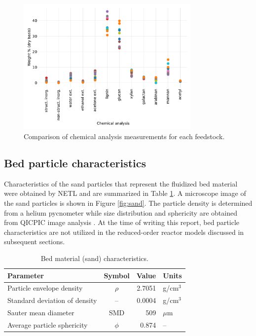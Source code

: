 \begin{figure}[H]
    \centering
    \includegraphics[width=0.8\textwidth]{figures/chem-analysis.pdf}
    \caption{Comparison of chemical analysis measurements for each feedstock.}
    \label{fig:chem-analysis}
\end{figure}

\subsection{Bed particle characteristics}

Characteristics of the sand particles that represent the fluidized bed material were obtained by NETL and are summarized in Table \ref{tab:sand}. A microscope image of the sand particles is shown in Figure \ref{fig:sand}. The particle density is determined from a helium pycnometer while size distribution and sphericity are obtained from QICPIC image analysis \cite{Netl-2021}. At the time of writing this report, bed particle characteristics are not utilized in the reduced-order reactor models discussed in subsequent sections.

\begin{table}[H]
    \caption{Bed material (sand) characteristics.}
    \label{tab:sand}
    \centering
    \begin{tabular}{lcrl}
        \toprule
        Parameter & Symbol & Value & Units \\
        \midrule
        Particle envelope density     & $\rho$ & 2.7051 & g/cm$^3$ \\
        Standard deviation of density & --     & 0.0004 & g/cm$^3$ \\
        Sauter mean diameter          & SMD    & 509    & $\mu$m \\
        Average particle sphericity   & $\phi$ & 0.874  & -- \\
        \bottomrule
    \end{tabular}
\end{table}

